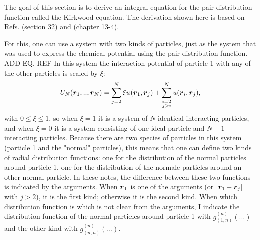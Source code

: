 

The goal of this section is to derive an integral equation for the pair-distribution function called the Kirkwood equation.
The derivation shown here is based on Refs. \cite{hill1987statistical} (section 32) and \cite{mcquarrie2000statistical} (chapter 13-4).



For this, one can use a system with two kinds of particles,
just as the system that was used to express the chemical potential using the pair-distribution function. ADD EQ. REF
In this system the interaction potential of particle 1 with any of the other particles is scaled by $\xi$:
\begin{align}\label{eq:kirkwood:UN_xi}
U_N(\boldsymbol{r}_1,..,\boldsymbol{r}_N) = \sum_{j=2}^{N} \xi u(\boldsymbol{r}_1,\boldsymbol{r}_j)
+ \sum_{\substack{i=2 \\ j>i}}^N u(\boldsymbol{r}_i,\boldsymbol{r}_j),
\end{align}
with $0 \leq \xi \leq 1$,
so when $\xi = 1$ it is a system of $N$ identical interacting particles,
and when $\xi = 0$ it is a system consisting of one ideal particle and $N-1$ interacting particles.
Because there are two species of particles in this system (particle 1 and the 
"normal" particles),
this means that one can define two kinds of radial distribution functions:
one for the distribution of the normal particles around particle 1,
one for the distribution of the normale particles around an other normal particle.
In these notes, the difference between these two functions is indicated by the arguments.
When $\boldsymbol{r}_1$ is one of the arguments (or $|\boldsymbol{r}_1 - \boldsymbol{r}_j|$ with $j>2$),
it is the first kind; otherwise it is the second kind.
When which distribution function is which is not clear from the arguments,
I indicate the distribution function of the normal particles around particle 1 with
$g^{(n)}_{(1,n)}(...)$ and the other kind with $g^{(n)}_{(n,n)}(...)$.

